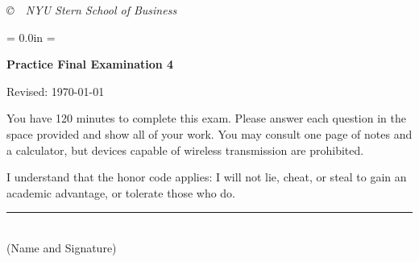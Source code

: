 \documentclass[letterpaper,12pt]{exam}
\def\HeadName{Practice Final Examination 1}
\begin{document}


\vfill \centerline{\it \copyright \ \number\year \
NYU Stern School of Business}

\newpage
\def\HeadName{Practice Final Examination 4}
\parindent = 0.0in
\parskip = \bigskipamount
\thispagestyle{empty}%
\Head

\centerline{\large \bf \HeadName}%
\centerline{Revised:  \today}

\bigskip
You have 120 minutes to complete this exam.  Please answer each
question in the space provided and show all of your work.
You may consult one page of notes and a calculator,
but devices capable of wireless transmission are prohibited.

I understand that the honor code applies: I will not lie, cheat,
or steal to gain an academic advantage, or tolerate those who do.

\begin{flushright}
\rule{4in}{0.5pt} \\ (Name and Signature)
\end{flushright}
\end{document}
